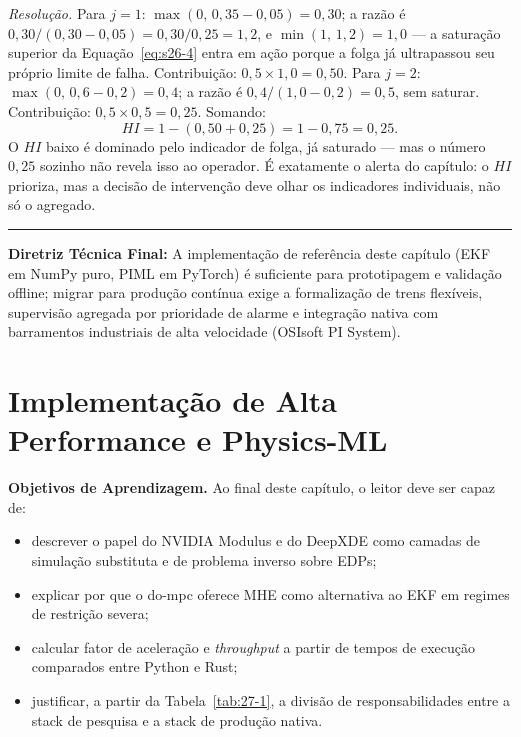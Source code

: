 \documentclass[12pt,a4paper]{article}
\numberwithin{equation}{section}
\numberwithin{table}{section}
\numberwithin{figure}{section}
\begin{document}
	\emph{Resolução.} Para $j=1$:
	$\max(0,\,0{,}35-0{,}05)=0{,}30$; a razão é
	$0{,}30/(0{,}30-0{,}05)=0{,}30/0{,}25=1{,}2$, e
	$\min(1,\,1{,}2)=1{,}0$ --- a saturação superior da
	Equação~\eqref{eq:s26-4} entra em ação porque a folga já ultrapassou
	seu próprio limite de falha. Contribuição: $0{,}5 \times 1{,}0 =
	0{,}50$. Para $j=2$: $\max(0,\,0{,}6-0{,}2)=0{,}4$; a razão é
	$0{,}4/(1{,}0-0{,}2)=0{,}5$, sem saturar. Contribuição:
	$0{,}5 \times 0{,}5 = 0{,}25$. Somando:
	$$HI = 1 - (0{,}50+0{,}25) = 1 - 0{,}75 = 0{,}25.$$
	O $HI$ baixo é dominado pelo indicador de folga, já saturado --- mas o
	número $0{,}25$ sozinho não revela isso ao operador. É exatamente o
	alerta do capítulo: o $HI$ prioriza, mas a decisão de intervenção deve
	olhar os indicadores individuais, não só o agregado.

	\vspace{1em}
	\hrule
	\vspace{1em}

	\textbf{Diretriz Técnica Final:} A implementação de referência deste capítulo (EKF em NumPy puro, PIML em PyTorch) é suficiente para prototipagem e validação offline; migrar para produção contínua exige a formalização de trens flexíveis, supervisão agregada por prioridade de alarme e integração nativa com barramentos industriais de alta velocidade (OSIsoft PI System).

	\newpage
	
	\clearpage
	\section{Implementação de Alta Performance e Physics-ML}

	\textbf{Objetivos de Aprendizagem.} Ao final deste capítulo, o leitor
	deve ser capaz de:
	\begin{itemize}
		\item descrever o papel do NVIDIA Modulus e do DeepXDE como
		camadas de simulação substituta e de problema inverso sobre
		EDPs;
		\item explicar por que o do-mpc oferece MHE como alternativa ao
		EKF em regimes de restrição severa;
		\item calcular fator de aceleração e \textit{throughput} a
		partir de tempos de execução comparados entre Python e Rust;
		\item justificar, a partir da Tabela~\ref{tab:27-1}, a divisão de
		responsabilidades entre a stack de pesquisa e a stack de
		produção nativa.
	\end{itemize}
\end{document}
